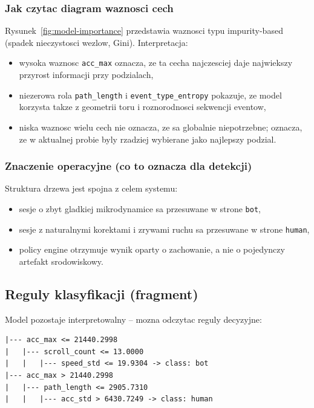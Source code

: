 \subsubsection{Jak czytac diagram waznosci cech}
Rysunek~\ref{fig:model-importance} przedstawia waznosci typu impurity-based
(spadek nieczystosci wezlow, Gini). Interpretacja:
\begin{itemize}
  \item wysoka waznosc \texttt{acc\_max} oznacza, ze ta cecha najczesciej daje
  najwiekszy przyrost informacji przy podzialach,
  \item niezerowa rola \texttt{path\_length} i \texttt{event\_type\_entropy}
  pokazuje, ze model korzysta takze z geometrii toru i roznorodnosci sekwencji eventow,
  \item niska waznosc wielu cech nie oznacza, ze sa globalnie niepotrzebne; oznacza,
  ze w aktualnej probie byly rzadziej wybierane jako najlepszy podzial.
\end{itemize}

\subsubsection{Znaczenie operacyjne (co to oznacza dla detekcji)}
Struktura drzewa jest spojna z celem systemu:
\begin{itemize}
  \item sesje o zbyt gladkiej mikrodynamice sa przesuwane w strone \texttt{bot},
  \item sesje z naturalnymi korektami i zrywami ruchu sa przesuwane w strone \texttt{human},
  \item policy engine otrzymuje wynik oparty o zachowanie, a nie o pojedynczy artefakt
  srodowiskowy.
\end{itemize}

\subsection{Reguly klasyfikacji (fragment)}
Model pozostaje interpretowalny -- mozna odczytac reguly decyzyjne:
\begin{lstlisting}[style=reportcode,caption={Przykladowy fragment regul drzewa decyzyjnego},label={lst:tree-rules-fragment}]
|--- acc_max <= 21440.2998
|   |--- scroll_count <= 13.0000
|   |   |--- speed_std <= 19.9304 -> class: bot
|--- acc_max > 21440.2998
|   |--- path_length <= 2905.7310
|   |   |--- acc_std > 6430.7249 -> class: human
\end{lstlisting}

